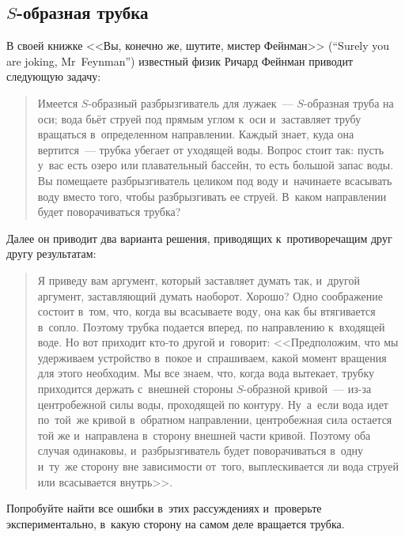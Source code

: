 \documentclass[a4paper,12pt]{article}
\begin{document}
\subsection{$S$-образная трубка}
В своей книжке <<Вы, конечно же, шутите, мистер Фейнман>> (``Surely you are joking, Mr~Feynman'')
известный физик Ричард Фейнман приводит следующую задачу:
\begin{quote} Имеется $S$-образный разбрызгиватель для лужаек~--- $S$-образная труба на оси;
вода бьёт струей под прямым углом к~оси и~заставляет трубу вращаться в~определенном направлении.
Каждый знает, куда она вертится~--- трубка убегает от уходящей воды. Вопрос стоит так: пусть у~вас
есть озеро или плавательный бассейн, то есть большой запас воды. Вы помещаете разбрызгиватель целиком
под воду и~начинаете всасывать воду вместо того, чтобы разбрызгивать ее струей. В~каком направлении
будет поворачиваться трубка?
\end{quote}
Далее он приводит два варианта решения, приводящих к~противоречащим друг другу результатам:
\begin{quote}
Я приведу вам аргумент, который заставляет думать так, и~другой аргумент, заставляющий думать наоборот. Хорошо?
Одно соображение состоит в~том, что, когда вы всасываете воду, она как бы втягивается в~сопло.
Поэтому трубка подается вперед, по направлению к~входящей воде.
Но вот приходит кто-то другой и~говорит: <<Предположим, что мы удерживаем устройство в~покое и~спрашиваем,
какой момент вращения для этого необходим. Мы все знаем, что, когда вода вытекает, трубку приходится
держать с~внешней стороны $S$-образной кривой~--- из-за центробежной силы воды, проходящей по контуру.
\hbox{Ну~а~если} вода идет по~той~же кривой в~обратном направлении, центробежная сила остается той же
и~направлена в~сторону внешней части кривой. Поэтому оба случая одинаковы, и~разбрызгиватель
будет поворачиваться в~одну и~ту~же сторону вне зависимости от~того, выплескивается ли вода
струей или всасывается внутрь>>.
\end{quote}
Попробуйте найти все ошибки в~этих рассуждениях и~проверьте экспериментально,
в~какую сторону на самом деле вращается трубка.
\end{document}
